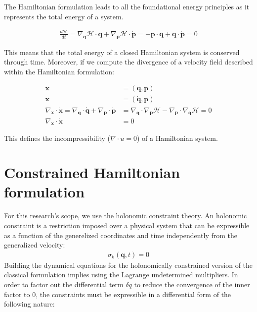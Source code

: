 \documentclass[draft]{agujournal2019}
\begin{document}
\begin{definition}
    The Hamiltonian formulation leads to all the foundational energy principles as it represents the total energy of a system.

\begin{align}
    \frac{d\mathcal{H}}{dt} = \nabla_\mathbf{q} \mathcal{H} \cdot \dot{\mathbf{q}} + \nabla_\mathbf{p} \mathcal{H} \cdot \dot{\mathbf{p}} = - \mathbf{p} \cdot \dot{\mathbf{q}} + \dot{\mathbf{q}} \cdot \dot{\mathbf{p}} = 0
\end{align}

This means that the total energy of a closed Hamiltonian system is conserved through time.
Moreover, if we compute the divergence of a velocity field described within the Hamiltonian formulation:

\begin{align}
    \mathbf{x} &= (\mathbf{q}, \mathbf{p}) \\
    \dot{\mathbf{x}} &= (\dot{\mathbf{q}}, \dot{\mathbf{p}}) \\
    \nabla_\mathbf{x} \cdot \dot{\mathbf{x}} = \nabla_\mathbf{q} \cdot \dot{\mathbf{q}} + \nabla_\mathbf{p} \cdot \dot{\mathbf{p}} &= \nabla_\mathbf{q} \cdot \nabla_\mathbf{p} \mathcal{H} - \nabla_\mathbf{p} \cdot \nabla_\mathbf{q} \mathcal{H} = 0 \\
    \nabla_\mathbf{x} \cdot \dot{\mathbf{x}} &= 0
\end{align}

This defines the incompressibility ($\nabla \cdot u = 0$) of a Hamiltonian system.


\section{Constrained Hamiltonian formulation}

For this research's scope, we use the holonomic constraint theory. An holonomic constraint is a restriction imposed over a physical system that can be expressible as a function of the generelized coordinates and time independently from the generalized velocity:
\begin{align*}
    \sigma_k \left( \mathbf{q}, t \right) = 0
\end{align*}
Building the dynamical equations for the holonomically constrained version of the classical formulation implies using the Lagrange undetermined multipliers. In order to factor out the differential term $\delta q$ to reduce the convergence of the inner factor to $0$, the constraints must be expressible in a differential form of the following nature:


\end{definition}
\end{document}
